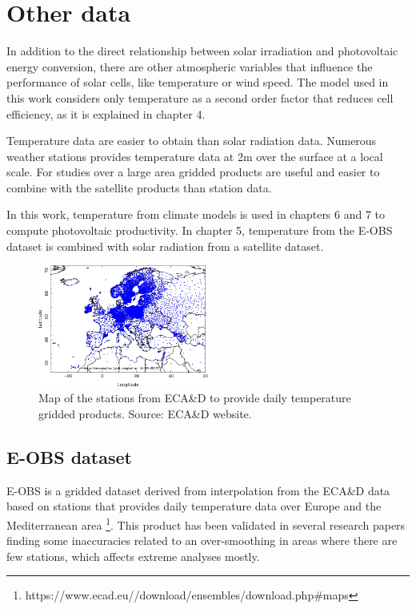 \section{Other data}%

  In addition to the direct relationship between solar irradiation and photovoltaic energy conversion, there are other atmospheric variables that influence the performance of solar cells, like temperature or wind speed. The model used in this work considers only temperature as a second order factor that reduces cell efficiency, as it is explained in chapter 4.
 
  Temperature data are easier to obtain than solar radiation data. Numerous weather stations provides temperature data at 2m over the surface at a local scale. For studies over a large area gridded products are useful and easier to combine with the satellite products than station data.

  In this work, temperature from climate models is used in chapters 6 and 7 to compute photovoltaic productivity. In chapter 5, temperature from the E-OBS dataset is combined with solar radiation from a satellite dataset.

  
\begin{figure}[h]
\centering
\includegraphics[width=0.5\textwidth]{figs/all_stations_plot.png}
\caption[Map of ECA&D stations]{Map of the stations from ECA\&D to provide daily temperature gridded products. Source: ECA\&D website.}
\label{fig:ecad}
\end{figure}

\subsection{E-OBS dataset}
  
  E-OBS is a gridded dataset derived from interpolation from the ECA\&D data based on stations that provides daily temperature data over Europe and the Mediterranean area \footnote{https://www.ecad.eu//download/ensembles/download.php#maps}. This product has been validated in several research papers \cite*{Begert2008, Hofstra2009} finding some inaccuracies related to an over-smoothing in areas where there are few stations, which affects extreme analyses mostly.

